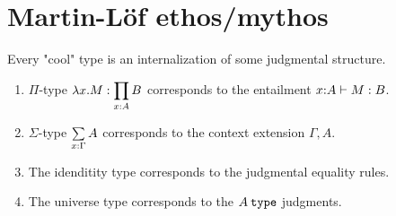 \documentclass[11pt]{article}
\begin{document}
\section{Martin-L\"of ethos/mythos}
Every "cool" type is an internalization of some judgmental structure.
\begin{enumerate}
\item $\Pi$-type $\oftype{\lam{x}{M}}{\displaystyle\prod_{x{:}A}B}$
  corresponds to the entailment $\oftype{x{:}A}{M}{B}$.
\item $\Sigma$-type $\dpairtype{x}{\Gamma}{A}$
  corresponds to the context extension $\Gamma, {A}$.
\item The idenditity type corresponds to the judgmental equality rules.
\item The universe type corresponds to the $\istype{A}$ judgments.
\end{enumerate}
\end{document}

